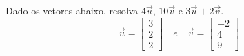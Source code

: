 	\construirExeresol



\begin{exeresol}
Dado os vetores abaixo, resolva $4\vec{u}$, $10\vec{v}$ e $3\vec{u} + 2\vec{v}$.
\begin{equation}
 \vec{u} =
\left[
  \begin{array}{c}
    3 \\
    2 \\
    2
  \end{array}
\right] \quad e \quad 
 \vec{v} =
\left[
  \begin{array}{c}
    -2 \\
    4 \\
    9
  \end{array}
\right]
\end{equation}
\end{exeresol}

